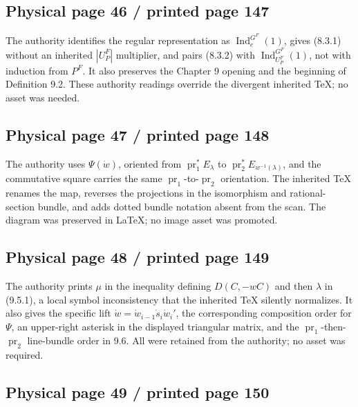 \documentclass[10pt]{article}
\begin{document}
\subsection*{Physical page 46 / printed page 147}

The authority identifies the regular representation as \(\operatorname{Ind}_e^{G^F}(1)\), gives (8.3.1) without an inherited \(|U_P^F|\) multiplier, and pairs (8.3.2) with \(\operatorname{Ind}_{U_P^F}^{G^F}(1)\), not with induction from \(P^F\). It also preserves the Chapter 9 opening and the beginning of Definition 9.2. These authority readings override the divergent inherited TeX; no asset was needed.\par

\subsection*{Physical page 47 / printed page 148}

The authority uses \(\Psi(\dot w)\), oriented from \(\operatorname{pr}_1^*E_\lambda\) to \(\operatorname{pr}_2^*E_{w^{-1}(\lambda)}\), and the commutative square carries the same \(\operatorname{pr}_1\)-to-\(\operatorname{pr}_2\) orientation. The inherited TeX renames the map, reverses the projections in the isomorphism and rational-section bundle, and adds dotted bundle notation absent from the scan. The diagram was preserved in LaTeX; no image asset was promoted.\par

\subsection*{Physical page 48 / printed page 149}

The authority prints \(\mu\) in the inequality defining \(D(C,-wC)\) and then \(\lambda\) in (9.5.1), a local symbol inconsistency that the inherited TeX silently normalizes. It also gives the specific lift \(\dot w=\dot w_{i-1}\dot s_i\dot w_i'\), the corresponding composition order for \(\Psi\), an upper-right asterisk in the displayed triangular matrix, and the \(\operatorname{pr}_1\)-then-\(\operatorname{pr}_2\) line-bundle order in 9.6. All were retained from the authority; no asset was required.\par

\subsection*{Physical page 49 / printed page 150}
\end{document}
